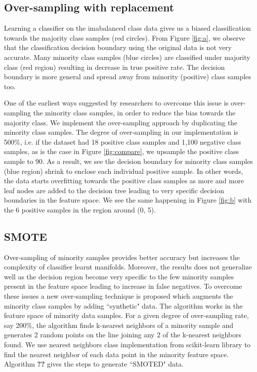 \documentclass[10pt,journal,compsoc]{IEEEtran}
\begin{document}
\subsection{Over-sampling with replacement}
Learning a classifier on the imabalanced class data gives us a biased classification towards the majority class samples (red circles).
From Figure \ref{fig:a}, we observe that the classification decision boundary using the original data is not very accurate. 
Many minority class samples (blue circles) are classified under majority class (red region) resulting in decrease in true positive rate. 
The decision boundary is more general and spread away from minority (positive) class samples too.

One of the earliest ways suggested by researchers to overcome this issue is over-sampling the minority class samples, in order to reduce the bias towards the majority class.
We implement the over-sampling approach by duplicating the minority class samples.
The degree of over-sampling in our implementation is 500\%, i.e. if the dataset had 18 positive class samples and 1,100 negative class samples, as is the case in Figure \ref{fig:compare}, we upsample the positive class sample to 90.
As a result, we see the decision boundary for minority class samples (blue region) shrink to enclose each individual positive sample.
In other words, the data starts overfitting towards the positive class samples as more and more leaf nodes are added to the decision tree leading to very specific decision boundaries in the feature space.
We see the same happening in Figure \ref{fig:b} with the 6 positive samples in the region around (0, 5).

\subsection{SMOTE}
Over-sampling of minority samples provides better accuracy but increases the complexity of classifier learnt manifolds. 
Moreover, the results does not generalize well as the decision region become very specific to the few minority samples present in the feature space leading to increase in false negatives.
To overcome these issues a new over-sampling technique is proposed which augments the minority class samples by adding ``synthetic" data.
The algorithm works in the feature space of minority data samples.
For a given degree of over-sampling rate, say 200\%, the algorithm finds k-nearest neighbors of a minority sample and generates 2 random points on the line joining any 2 of the k-nearest neighbors found.
We use nearest neighbors class implementation from scikit-learn library to find the nearest neighbor of each data point in the minority feature space.
Algorithm \textbf{??} gives the steps to generate ``SMOTED" data.
\end{document}
